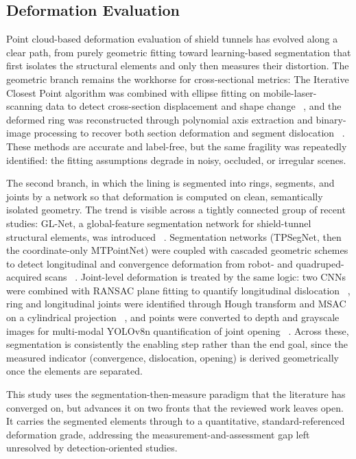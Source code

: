 \documentclass[preprint,12pt,authoryear]{elsarticle}
\begin{document}
\subsection{\textbf{Deformation Evaluation}}\label{deformation-evaluation}

Point cloud-based deformation evaluation of shield tunnels has evolved
along a clear path, from purely geometric fitting toward learning-based
segmentation that first isolates the structural elements and only then
measures their distortion. The geometric branch remains the workhorse
for cross-sectional metrics: The Iterative Closest Point algorithm was
combined with ellipse fitting on mobile-laser-scanning data to detect
cross-section displacement and shape change ~\citep{Camara2025}, and
the deformed ring was reconstructed through polynomial axis extraction
and binary-image processing to recover both section deformation and
segment dislocation ~\citep{Zhang2024}. These methods are accurate and
label-free, but the same fragility was repeatedly identified: the
fitting assumptions degrade in noisy, occluded, or irregular scenes.

The second branch, in which the lining is segmented into rings,
segments, and joints by a network so that deformation is computed on
clean, semantically isolated geometry. The trend is visible across a
tightly connected group of recent studies: GL-Net, a global-feature
segmentation network for shield-tunnel structural elements, was
introduced ~\citep{Li2023}. Segmentation networks (TPSegNet, then the
coordinate-only MTPointNet) were coupled with cascaded geometric schemes
to detect longitudinal and convergence deformation from robot- and
quadruped-acquired scans ~\citep{Feng2025,Feng2026}. Joint-level
deformation is treated by the same logic: two CNNs were combined with
RANSAC plane fitting to quantify longitudinal dislocation ~\citep{Yu2021}, 
ring and longitudinal joints were identified through Hough
transform and MSAC on a cylindrical projection ~\citep{Shen2025}, and
points were converted to depth and grayscale images for multi-modal
YOLOv8n quantification of joint opening ~\citep{Liu2025}. Across
these, segmentation is consistently the enabling step rather than the
end goal, since the measured indicator (convergence, dislocation,
opening) is derived geometrically once the elements are separated.

This study uses the segmentation-then-measure paradigm that the
literature has converged on, but advances it on two fronts that the
reviewed work leaves open. It carries the segmented elements through to
a quantitative, standard-referenced deformation grade, addressing the
measurement-and-assessment gap left unresolved by detection-oriented
studies.
\end{document}
